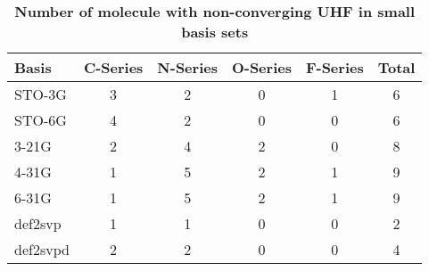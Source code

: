 \begin{table}
  \caption{\textbf{Number of molecule with non-converging UHF in small basis sets}}
  \label{tbl:conv-issues}
  \begin{tabular}{l c c c c c }
    \hline
    Basis & C-Series & N-Series & O-Series & F-Series & Total \\ 
    \hline
    STO-3G & 3 & 2 & 0 & 1 & 6 \\ 
    STO-6G & 4 & 2 & 0 & 0 & 6 \\ 
    3-21G & 2 & 4 & 2 & 0 & 8 \\ 
    4-31G & 1 & 5 & 2 & 1 & 9 \\ 
    6-31G & 1 & 5 & 2 & 1 & 9 \\ 
    def2svp & 1 & 1 & 0 & 0 & 2 \\ 
    def2svpd & 2 & 2 & 0 & 0 & 4 \\ 
    \hline
  \end{tabular}
\end{table}
